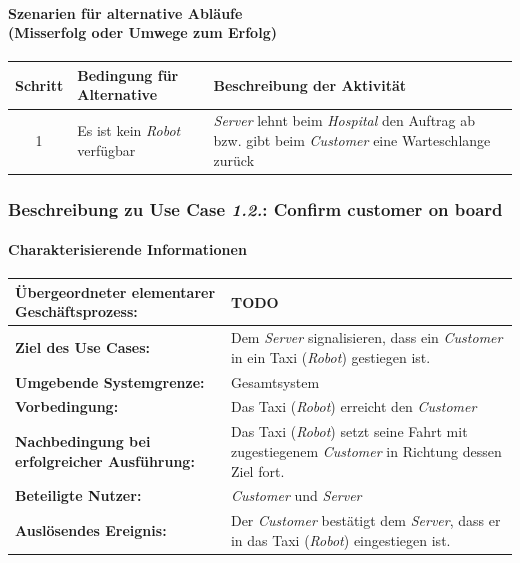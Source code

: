 			\paragraph*{Szenarien für alternative Abläufe\\ (Misserfolg oder Umwege zum Erfolg)}	
					
			\begin{table}[H]
					\centering
					\begin{tabularx}{\textwidth}{|c|p{2cm}|X|}
					\hline
					Schritt & Bedingung für Alternative & Beschreibung der Aktivität \\ \hline
					1 & Es ist kein \emph{Robot} verfügbar & \emph{Server} lehnt beim \emph{Hospital} den Auftrag ab bzw. gibt beim \emph{Customer} eine Warteschlange zurück \\
					\hline
					\end{tabularx}
				\end{table}
				
				
			
			
		
			
			\pagebreak
	
			\subsubsection{Beschreibung zu Use Case \emph{1.2.}: Confirm customer on board}
				\paragraph*{Charakterisierende Informationen}
				
				\begin{table}[H]
					\centering
					\begin{tabularx}{\textwidth}{|p{5cm}|X|}
						\hline
						\textbf{Übergeordneter elementarer Geschäftsprozess:} & TODO  \\ \hline
						\textbf{Ziel des Use Cases:} & Dem \emph{Server} signalisieren, dass ein \emph{Customer} in ein Taxi (\emph{Robot}) gestiegen ist. \\ \hline
						\textbf{Umgebende Systemgrenze:} & Gesamtsystem \\ \hline
						\textbf{Vorbedingung:} & Das Taxi (\emph{Robot}) erreicht den \emph {Customer} \\ \hline
						\textbf{Nachbedingung bei erfolgreicher Ausführung:} & Das Taxi (\emph{Robot}) setzt seine Fahrt mit zugestiegenem \emph{Customer} in Richtung dessen Ziel fort. \\ \hline
						\textbf{Beteiligte Nutzer:} & \emph{Customer} und \emph{Server} \\ \hline
						\textbf{Auslösendes Ereignis:} & Der \emph{Customer} bestätigt dem \emph{Server}, dass er in das Taxi (\emph{Robot}) eingestiegen ist. \\
						\hline
					\end{tabularx}
				\end{table}
				
